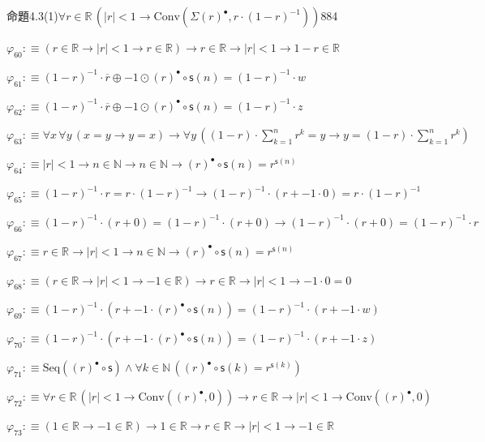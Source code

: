 \begin{fullproof}{命題4.3(1)}{$\forall r \in \mathbb{R}\,(\lvert r \rvert < 1 \to \mathrm{Conv}(\Sigma {(r)^{\bullet}},r \cdot (1 - r)^{-1}))$}{884}
\begin{abbrevlist}
\item $\varphi_{60} :\equiv (r \in \mathbb{R} \to \lvert r \rvert < 1 \to r \in \mathbb{R}) \to r \in \mathbb{R} \to \lvert r \rvert < 1 \to 1 - r \in \mathbb{R}$
\item $\varphi_{61} :\equiv (1 - r)^{-1} \cdot \overline{r} \oplus -1 \odot {(r)^{\bullet}} \circ \mathsf{s}(n) = (1 - r)^{-1} \cdot w$
\item $\varphi_{62} :\equiv (1 - r)^{-1} \cdot \overline{r} \oplus -1 \odot {(r)^{\bullet}} \circ \mathsf{s}(n) = (1 - r)^{-1} \cdot z$
\item $\varphi_{63} :\equiv \forall x\,\forall y\,(x = y \to y = x) \to \forall y\,((1 - r) \cdot {\textstyle\sum_{k=1}^{n} {{r}^{k}}} = y \to y = (1 - r) \cdot {\textstyle\sum_{k=1}^{n} {{r}^{k}}})$
\item $\varphi_{64} :\equiv \lvert r \rvert < 1 \to n \in \mathbb{N} \to n \in \mathbb{N} \to {(r)^{\bullet}} \circ \mathsf{s}(n) = {{r}^{\mathsf{s}(n)}}$
\item $\varphi_{65} :\equiv (1 - r)^{-1} \cdot r = r \cdot (1 - r)^{-1} \to (1 - r)^{-1} \cdot (r + -1 \cdot 0) = r \cdot (1 - r)^{-1}$
\item $\varphi_{66} :\equiv (1 - r)^{-1} \cdot (r + 0) = (1 - r)^{-1} \cdot (r + 0) \to (1 - r)^{-1} \cdot (r + 0) = (1 - r)^{-1} \cdot r$
\item $\varphi_{67} :\equiv r \in \mathbb{R} \to \lvert r \rvert < 1 \to n \in \mathbb{N} \to {(r)^{\bullet}} \circ \mathsf{s}(n) = {{r}^{\mathsf{s}(n)}}$
\item $\varphi_{68} :\equiv (r \in \mathbb{R} \to \lvert r \rvert < 1 \to -1 \in \mathbb{R}) \to r \in \mathbb{R} \to \lvert r \rvert < 1 \to -1 \cdot 0 = 0$
\item $\varphi_{69} :\equiv (1 - r)^{-1} \cdot (r + -1 \cdot {(r)^{\bullet}} \circ \mathsf{s}(n)) = (1 - r)^{-1} \cdot (r + -1 \cdot w)$
\item $\varphi_{70} :\equiv (1 - r)^{-1} \cdot (r + -1 \cdot {(r)^{\bullet}} \circ \mathsf{s}(n)) = (1 - r)^{-1} \cdot (r + -1 \cdot z)$
\item $\varphi_{71} :\equiv \mathrm{Seq}({(r)^{\bullet}} \circ \mathsf{s}) \land \forall k \in \mathbb{N}\,({(r)^{\bullet}} \circ \mathsf{s}(k) = {{r}^{\mathsf{s}(k)}})$
\item $\varphi_{72} :\equiv \forall r \in \mathbb{R}\,(\lvert r \rvert < 1 \to \mathrm{Conv}({(r)^{\bullet}},0)) \to r \in \mathbb{R} \to \lvert r \rvert < 1 \to \mathrm{Conv}({(r)^{\bullet}},0)$
\item $\varphi_{73} :\equiv (1 \in \mathbb{R} \to -1 \in \mathbb{R}) \to 1 \in \mathbb{R} \to r \in \mathbb{R} \to \lvert r \rvert < 1 \to -1 \in \mathbb{R}$

\end{abbrevlist}
\end{fullproof}
